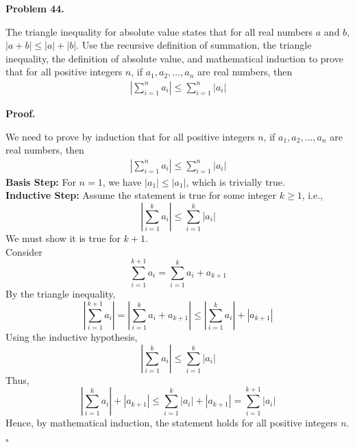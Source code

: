 \documentclass{article}
\newenvironment{problem}[1]{
    \begin{mdframed}[backgroundcolor=gray!20, skipabove=\baselineskip, skipbelow=\baselineskip, nobreak=true, innerleftmargin=10pt, innerrightmargin=10pt, innertopmargin=10pt, innerbottommargin=10pt]
    \textbf{Problem #1.}
}{
    \end{mdframed}
}
\newenvironment{proof}{
    \begin{mdframed}[nobreak=false, innerleftmargin=10pt, innerrightmargin=10pt, innertopmargin=10pt, innerbottommargin=10pt]
    \textbf{Proof.}
}{
    \hfill $\square$
    \end{mdframed}
}
\begin{document}
    \begin{problem}{44}
        The triangle inequality for absolute value states that for all real numbers $a$ and $b$, $|a + b| \leq |a| + |b|$. Use the recursive definition of summation, the triangle inequality, the definition of absolute value, and mathematical induction to prove that for all positive integers $n$, if $a_1, a_2, \ldots, a_n$ are real numbers, then
        \begin{align*}
            \left|\sum_{i=1}^{n}a_i \right| \leq \sum_{i=1}^{n}|a_i|
        \end{align*}
    \end{problem}
    \begin{proof}
        We need to prove by induction that for all positive integers $n$, if $a_1, a_2, \ldots, a_n$ are real numbers, then
        \begin{align*}
            \left|\sum_{i=1}^{n}a_i \right| \leq \sum_{i=1}^{n}|a_i|
        \end{align*}
        \textbf{Basis Step:}
        For $n = 1$, we have $|a_1| \leq |a_1|$, which is trivially true. \\
        \textbf{Inductive Step:}
        Assume the statement is true for some integer $k \geq 1$, i.e., 
        \[ \left|\sum_{i=1}^{k}a_i \right| \leq \sum_{i=1}^{k}|a_i| \]
        We must show it is true for $k + 1$. \\
        Consider
        \[ \sum_{i=1}^{k+1}a_i = \sum_{i=1}^{k}a_i + a_{k+1} \]
        By the triangle inequality,
        \[ \left|\sum_{i=1}^{k+1}a_i \right| = \left|\sum_{i=1}^{k}a_i + a_{k+1}\right| \leq \left|\sum_{i=1}^{k}a_i\right| + |a_{k+1}| \]
        Using the inductive hypothesis,
        \[ \left|\sum_{i=1}^{k}a_i\right| \leq \sum_{i=1}^{k}|a_i| \]
        Thus,
        \[ \left|\sum_{i=1}^{k}a_i\right| + |a_{k+1}| \leq \sum_{i=1}^{k}|a_i| + |a_{k+1}| = \sum_{i=1}^{k+1}|a_i| \]
        Hence, by mathematical induction, the statement holds for all positive integers $n$.
    \end{proof}


\end{document}
